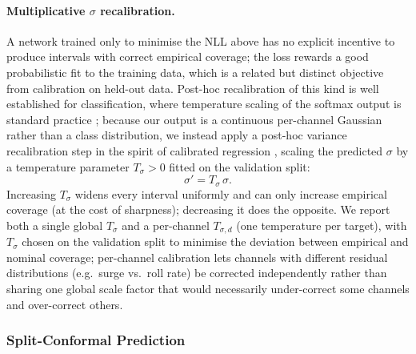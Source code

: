 \documentclass[a4paper,fleqn]{cas-sc}
\begin{document}
\paragraph{Multiplicative $\sigma$ recalibration.} A network trained only to minimise the NLL above has no explicit incentive to produce intervals with correct empirical coverage; the loss rewards a good probabilistic fit to the training data, which is a related but distinct objective from calibration on held-out data. Post-hoc recalibration of this kind is well established for classification, where temperature scaling of the softmax output is standard practice \cite{guo2017calibration}; because our output is a continuous per-channel Gaussian rather than a class distribution, we instead apply a post-hoc variance recalibration step in the spirit of calibrated regression \cite{kuleshov2018calibrated}, scaling the predicted $\sigma$ by a temperature parameter $T_{\sigma}>0$ fitted on the validation split:
\[
\sigma' = T_{\sigma}\,\sigma.
\]
Increasing $T_\sigma$ widens every interval uniformly and can only increase empirical coverage (at the cost of sharpness); decreasing it does the opposite. We report both a single global $T_\sigma$ and a per-channel $T_{\sigma,d}$ (one temperature per target), with $T_\sigma$ chosen on the validation split to minimise the deviation between empirical and nominal coverage; per-channel calibration lets channels with different residual distributions (e.g.\ surge vs.\ roll rate) be corrected independently rather than sharing one global scale factor that would necessarily under-correct some channels and over-correct others.

\subsubsection{Split-Conformal Prediction}
\label{sec:conformal-method}
\end{document}
